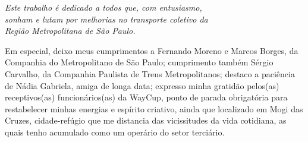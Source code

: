 \instituicao{ \\
	}
%
%
%
\local{}
%
%
\tipotrabalho{}
%
%
\ano{}
\data{} %
%
\orientador{}
\examinadorum{}
%
%

	\begin{dedicatoria}
	   \vspace*{\fill}
	   \centering
	   \noindent
	   \textit{ Este trabalho é dedicado a todos que, com entusiasmo,\\
	   sonham e lutam por melhorias no transporte coletivo da\\
	   Região Metropolitana de São Paulo.} \vspace*{\fill}
	\end{dedicatoria}
	
	
	\begin{agradecimentos}
	Em especial, deixo meus cumprimentos a Fernando Moreno e Marcos Borges, da Companhia do Metropolitano de São Paulo; cumprimento também Sérgio Carvalho, da Companhia Paulista de Trens Metropolitanos; destaco a paciência de Nádia Gabriela, amiga de longa data; expresso minha gratidão pelos(as) receptivos(as) funcionários(as) da WayCup, ponto de parada obrigatória para restabelecer minhas energias e espírito criativo, ainda que localizado em Mogi das Cruzes, cidade-refúgio que me distancia das vicissitudes da vida cotidiana, as quais tenho acumulado como um operário do setor terciário.
	\end{agradecimentos}
	
